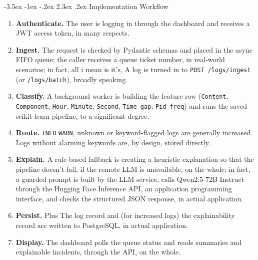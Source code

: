 \documentclass[12pt,a4paper]{report}
\makeatletter
\renewcommand\section{\@startsection {section}{1}{\z@}%
  {-3.5ex \@plus -1ex \@minus -.2ex}%
  {2.3ex \@plus .2ex}%
  {\normalfont\fontsize{17}{21}\selectfont\bfseries}}
\makeatother
\begin{document}
\section{Implementation Workflow}
\begin{enumerate}[label=\arabic*.]
  \item \textbf{Authenticate.} The user is logging in through the dashboard and receives a JWT access token, in many respects.
  \item \textbf{Ingest.} The request is checked by Pydantic schemas and placed in the async FIFO queue; the caller receives a queue ticket number, in real-world scenarios; in fact, all i mean is it's, A log is turned in to \texttt{POST /logs/ingest} (or \texttt{/logs/batch}), broadly speaking.
  \item \textbf{Classify.} A background worker is building the feature row (\texttt{Content}, \texttt{Component}, \texttt{Hour}, \texttt{Minute}, \texttt{Second}, \texttt{Time\_gap}, \texttt{Pid\_freq}) and runs the saved scikit-learn pipeline, to a significant degree.
  \item \textbf{Route.} \texttt{INFO} \texttt{WARN}, unknown or keyword-flagged logs are generally increased. Logs without alarming keywords are, by design, stored directly.
  \item \textbf{Explain.} A rule-based fallback is creating a heuristic explanation so that the pipeline doesn't fail, if the remote LLM is unavailable, on the whole; in fact, a guarded prompt is built by the LLM service, calls Qwen2.5-72B-Instruct through the Hugging Face Inference API, an application programming interface, and checks the structured JSON response, in actual application.
  \item \textbf{Persist.} Plus The log record and (for increased logs) the explainability record are written to PostgreSQL, in actual application.
  \item \textbf{Display.} The dashboard polls the queue status and reads summaries and explainable incidents, through the API, on the whole.
\end{enumerate}
\end{document}
